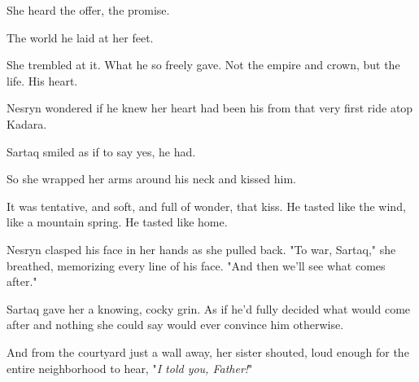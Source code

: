 She heard the offer, the promise.

The world he laid at her feet.

She trembled at it. What he so freely gave. Not the empire and crown, but  the life. His heart.

Nesryn wondered if he knew her heart had been his from that very first ride atop Kadara.

Sartaq smiled as if to say yes, he had.

So she wrapped her arms around his neck and kissed him.

It was tentative, and soft, and full of wonder, that kiss. He tasted like the wind, like a mountain spring. He tasted like home.

Nesryn clasped his face in her hands as she pulled back. "To war, Sartaq," she breathed, memorizing every line of his face. "And then we'll see what comes after."

Sartaq gave her a knowing, cocky grin. As if he'd fully decided what would come after and nothing she could say would ever convince him otherwise.

And from the courtyard just a wall away, her sister shouted, loud enough for the entire neighborhood to hear, "\emph{I told you, Father!}"

